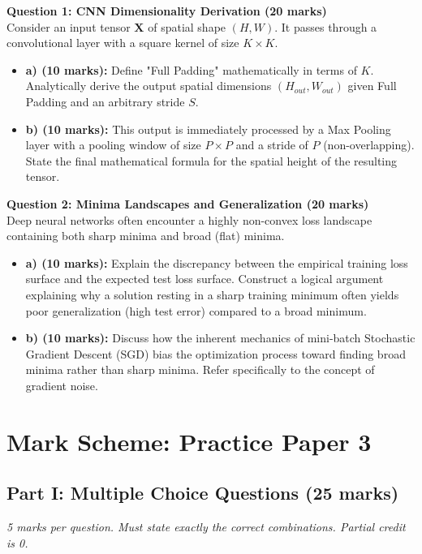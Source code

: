 \documentclass[11pt]{article}
\begin{document}
\textbf{Question 1: CNN Dimensionality Derivation (20 marks)}\\
Consider an input tensor $\mathbf{X}$ of spatial shape $(H, W)$. It passes through a convolutional layer with a square kernel of size $K \times K$. 
\begin{itemize}
    \item \textbf{a) (10 marks):} Define "Full Padding" mathematically in terms of $K$. Analytically derive the output spatial dimensions $(H_{out}, W_{out})$ given Full Padding and an arbitrary stride $S$.
    \item \textbf{b) (10 marks):} This output is immediately processed by a Max Pooling layer with a pooling window of size $P \times P$ and a stride of $P$ (non-overlapping). State the final mathematical formula for the spatial height of the resulting tensor.
\end{itemize}

\vspace{0.5cm}

\textbf{Question 2: Minima Landscapes and Generalization (20 marks)}\\
Deep neural networks often encounter a highly non-convex loss landscape containing both sharp minima and broad (flat) minima.
\begin{itemize}
    \item \textbf{a) (10 marks):} Explain the discrepancy between the empirical training loss surface and the expected test loss surface. Construct a logical argument explaining why a solution resting in a sharp training minimum often yields poor generalization (high test error) compared to a broad minimum.
    \item \textbf{b) (10 marks):} Discuss how the inherent mechanics of mini-batch Stochastic Gradient Descent (SGD) bias the optimization process toward finding broad minima rather than sharp minima. Refer specifically to the concept of gradient noise.
\end{itemize}

\newpage

\section*{Mark Scheme: Practice Paper 3}

\subsection*{Part I: Multiple Choice Questions (25 marks)}
\textit{5 marks per question. Must state exactly the correct combinations. Partial credit is 0.}
\end{document}
